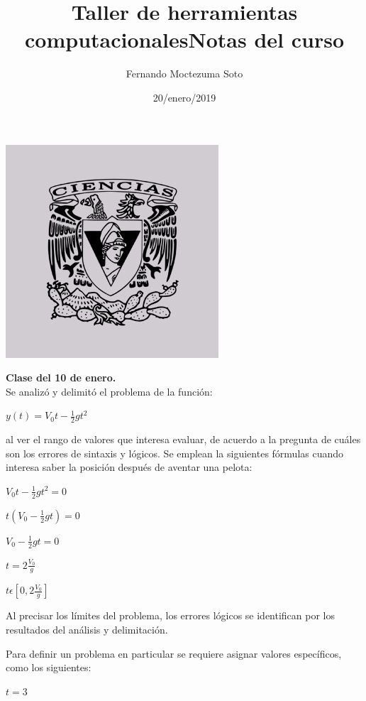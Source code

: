 \documentclass[etterpaper, 12pt, oneside]{article}%
\title{\Huge Taller de herramientas computacionales}
\author{Fernando Moctezuma Soto}
\date{20/enero/2019}
\begin{document}
	\maketitle
	
	\begin{center}
		\includegraphics[scale=0.40]{1.jpg}
	\end{center}
	
	\newpage
	
	\title{\Huge Notas del curso\\}
	
	\textbf{Clase del 10 de enero.}\\
	

	
	Se analizó y delimitó el problema de la función:
	
	$y(t)=V_{0}t-\frac{1}{2}gt^{2}$
	
	 al ver el rango de valores que interesa evaluar, de acuerdo a la pregunta de cuáles son los errores de sintaxis y lógicos. Se emplean la siguientes fórmulas cuando interesa saber la posición después de aventar una pelota:
	
	$V_{0}t-\frac{1}{2}gt^{2}=0$
	
	$t(V_{0}-\frac{1}{2}gt)=0$
	
	$V_{0}-\frac{1}{2}gt=0$
	
	$t=2\frac{V_{0}}{g}$
	
	$t\epsilon[0, 2\frac{V_{0}}{g}]$
	
	Al precisar los límites del problema, los errores lógicos se identifican por los resultados del análisis y delimitación.
	
	Para definir un problema en particular se requiere asignar valores específicos, como los siguientes:
	
	$t=3$
	
\end{document}

